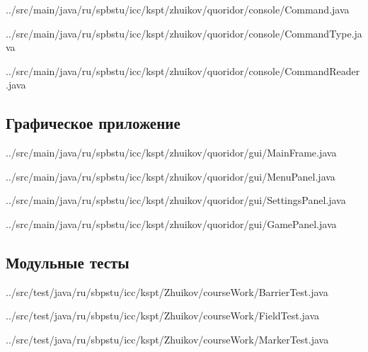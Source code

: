 \documentclass[a4paper]{article}
\begin{document}

{../src/main/java/ru/spbstu/icc/kspt/zhuikov/quoridor/console/Command.java}


{../src/main/java/ru/spbstu/icc/kspt/zhuikov/quoridor/console/CommandType.java}
\newpage


{../src/main/java/ru/spbstu/icc/kspt/zhuikov/quoridor/console/CommandReader.java}
\newpage

\subsection{Графическое приложение}


{../src/main/java/ru/spbstu/icc/kspt/zhuikov/quoridor/gui/MainFrame.java}
\newpage


{../src/main/java/ru/spbstu/icc/kspt/zhuikov/quoridor/gui/MenuPanel.java}
\newpage


{../src/main/java/ru/spbstu/icc/kspt/zhuikov/quoridor/gui/SettingsPanel.java}
\newpage


{../src/main/java/ru/spbstu/icc/kspt/zhuikov/quoridor/gui/GamePanel.java}
\newpage

\subsection{Модульные тесты}


{../src/test/java/ru/sbpstu/icc/kspt/Zhuikov/courseWork/BarrierTest.java}
\newpage


{../src/test/java/ru/sbpstu/icc/kspt/Zhuikov/courseWork/FieldTest.java}
\newpage


{../src/test/java/ru/sbpstu/icc/kspt/Zhuikov/courseWork/MarkerTest.java}
\newpage
\end{document}

